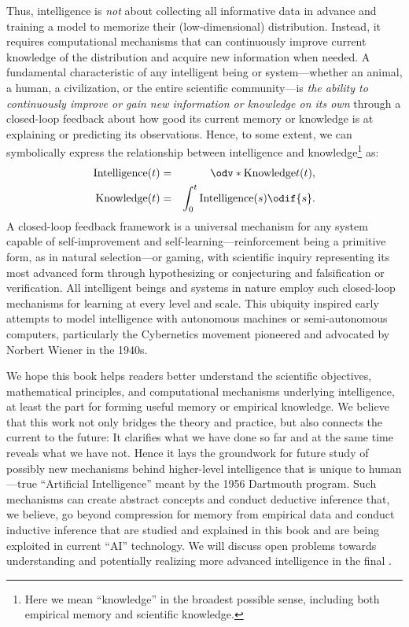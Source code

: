\documentclass[../../book-main.tex]{subfiles}
\begin{document}
Thus, intelligence is \textit{not} about collecting all informative
data in advance and training a model to memorize their
(low-dimensional) distribution. Instead, it requires computational
mechanisms that can continuously improve current knowledge of the
distribution and acquire new information when needed. A fundamental
characteristic of any intelligent being or system---whether an
animal, a human, a civilization, or the entire scientific
community---is \textit{the ability to continuously improve or gain
new information or knowledge on its own} through a closed-loop
feedback about how good its current memory or knowledge is at explaining or
predicting its observations. Hence, to some extent, we can
symbolically express the relationship between intelligence and
knowledge\footnote{Here we mean ``knowledge'' in the broadest
    possible sense, including both empirical memory and scientific
knowledge.} as:
\begin{eqnarray*}
    \operatorname{Intelligence}(t) &=&
    \odv*{\operatorname{Knowledge}}{t}(t), \\
    \operatorname{Knowledge}(t)  &=& \int_{0}^{t}
    \operatorname{Intelligence}(s) \odif{s}.
\end{eqnarray*}
A closed-loop feedback framework is a universal mechanism for any
system capable of self-improvement and self-learning---reinforcement
being a primitive form, as in natural selection---or gaming, with
scientific inquiry representing its most advanced form through
hypothesizing or conjecturing and falsification or verification. All
intelligent beings and systems in nature employ such closed-loop
mechanisms for learning at
every level and scale. This ubiquity inspired early attempts to model
intelligence with autonomous machines or semi-autonomous computers,
particularly the
Cybernetics movement pioneered and advocated by Norbert Wiener in the 1940s.

We hope this book helps readers better understand the scientific
objectives, mathematical  principles, and computational mechanisms
underlying intelligence, at least the part for forming useful memory
or empirical knowledge. We
believe that this work not only bridges the theory and practice, but
also connects the current to the future: It clarifies what we have
done so far and at the same time reveals what we have not. Hence it
lays the groundwork for
future study of possibly new mechanisms behind higher-level
intelligence that is unique to human---true ``Artificial
Intelligence'' meant by the 1956 Dartmouth program. Such mechanisms
can create abstract concepts and conduct deductive inference that, we
believe, go beyond compression for memory from empirical data and
conduct inductive inference that are studied and explained in this
book and are being exploited in current ``AI'' technology. We will
discuss open problems
towards understanding and potentially realizing more advanced
intelligence in the final .
\end{document}
